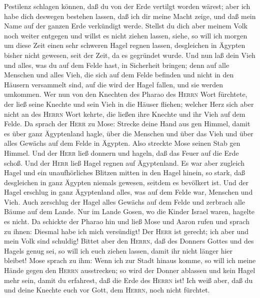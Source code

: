 Pestilenz schlagen können, daß du von der Erde vertilgt worden wärest;
 aber ich habe dich deswegen bestehen lassen, daß ich dir
meine Macht zeige, und daß mein Name auf der ganzen Erde verkündigt
werde.  Stellst du dich aber meinem Volk noch weiter
entgegen und willst es nicht ziehen lassen,  siehe, so
will ich morgen um diese Zeit einen sehr schweren Hagel regnen lassen,
desgleichen in Ägypten bisher nicht gewesen, seit der Zeit, da es
gegründet wurde.  Und nun laß dein Vieh und alles, was du
auf dem Felde hast, in Sicherheit bringen; denn auf alle Menschen und
alles Vieh, die sich auf dem Felde befinden und nicht in den Häusern
versammelt sind, auf die wird der Hagel fallen, und sie werden umkommen.
 Wer nun von den Knechten des Pharao des \textsc{Herrn}
Wort fürchtete, der ließ seine Knechte und sein Vieh in die Häuser
fliehen;  welcher Herz sich aber nicht an des
\textsc{Herrn} Wort kehrte, die ließen ihre Knechte und ihr Vieh auf dem
Felde.  Da sprach der \textsc{Herr} zu Mose: Strecke
deine Hand aus gen Himmel, damit es über ganz Ägyptenland hagle, über
die Menschen und über das Vieh und über alles Gewächs auf dem Felde in
Ägypten.  Also streckte Mose seinen Stab gen Himmel. Und
der \textsc{Herr} ließ donnern und hageln, daß das Feuer auf die Erde
schoß. Und der \textsc{Herr} ließ Hagel regnen auf Ägyptenland.
 Es war aber zugleich Hagel und ein unaufhörliches
Blitzen mitten in den Hagel hinein, so stark, daß desgleichen in ganz
Ägypten niemals gewesen, seitdem es bevölkert ist.  Und
der Hagel erschlug in ganz Ägyptenland alles, was auf dem Felde war,
Menschen und Vieh. Auch zerschlug der Hagel alles Gewächs auf dem Felde
und zerbrach alle Bäume auf dem Lande.  Nur im Lande
Gosen, wo die Kinder Israel waren, hagelte es nicht.  Da
schickte der Pharao hin und ließ Mose und Aaron rufen und sprach zu
ihnen: Diesmal habe ich mich versündigt! Der \textsc{Herr} ist gerecht;
ich aber und mein Volk sind schuldig!  Bittet aber den
\textsc{Herrn}, daß des Donners Gottes und des Hagels genug sei, so will
ich euch ziehen lassen, damit ihr nicht länger hier bleibet!
 Mose sprach zu ihm: Wenn ich zur Stadt hinaus komme, so
will ich meine Hände gegen den \textsc{Herrn} ausstrecken; so wird der
Donner ablassen und kein Hagel mehr sein, damit du erfahrest, daß die
Erde des \textsc{Herrn} ist!  Ich weiß aber, daß du und
deine Knechte euch vor Gott, dem \textsc{Herrn}, noch nicht fürchtet.
